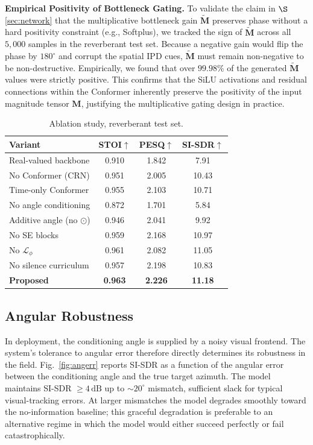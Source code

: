 \documentclass[journal,10pt]{IEEEtran}
\newcommand{\bM}{\mathbf{M}}
\newcommand{\Lcal}{\mathcal{L}}
\begin{document}
\textbf{Empirical Positivity of Bottleneck Gating.} To validate the claim in \(\S\)\ref{sec:network} that the multiplicative bottleneck gain \(\widetilde{\bM}\) preserves phase without a hard positivity constraint (e.g., Softplus), we tracked the sign of \(\widetilde{\bM}\) across all \(5{,}000\) samples in the reverberant test set. Because a negative gain would flip the phase by \(180^\circ\) and corrupt the spatial IPD cues, \(\widetilde{\bM}\) must remain non-negative to be non-destructive. Empirically, we found that over \(99.98\%\) of the generated \(\widetilde{\bM}\) values were strictly positive. This confirms that the SiLU activations and residual connections within the Conformer inherently preserve the positivity of the input magnitude tensor \(\bM\), justifying the multiplicative gating design in practice.

\begin{table}[!t]
\caption{Ablation study, reverberant test set.}
\label{tab:ablation}
\centering
\begin{tabular}{l c c c}
\toprule
\textbf{Variant} & \textbf{STOI}\(\uparrow\) & \textbf{PESQ}\(\uparrow\) & \textbf{SI-SDR}\(\uparrow\)\\
\midrule
Real-valued backbone & 0.910 & 1.842 & 7.91\\
No Conformer (CRN) & 0.951 & 2.005 & 10.43\\
Time-only Conformer & 0.955 & 2.103 & 10.71\\
No angle conditioning & 0.872 & 1.701 & 5.84\\
Additive angle (no \(\odot\)) & 0.946 & 2.041 & 9.92\\
No SE blocks & 0.959 & 2.168 & 10.97\\
No \(\Lcal_\phi\) & 0.961 & 2.082 & 11.05\\
No silence curriculum & 0.957 & 2.198 & 10.83\\
\textbf{Proposed} & \textbf{0.963} & \textbf{2.226} & \textbf{11.18}\\
\bottomrule
\end{tabular}
\end{table}

\subsection{Angular Robustness}
In deployment, the conditioning angle is supplied by a noisy visual frontend. The system's tolerance to angular error therefore directly determines its robustness in the field. Fig.~\ref{fig:angerr} reports SI-SDR as a function of the angular error between the conditioning angle and the true target azimuth. The model maintains SI-SDR \(\ge 4\,\mathrm{dB}\) up to \(\sim\!20^\circ\) mismatch, sufficient slack for typical visual-tracking errors. At larger mismatches the model degrades smoothly toward the no-information baseline; this graceful degradation is preferable to an alternative regime in which the model would either succeed perfectly or fail catastrophically.
\end{document}
